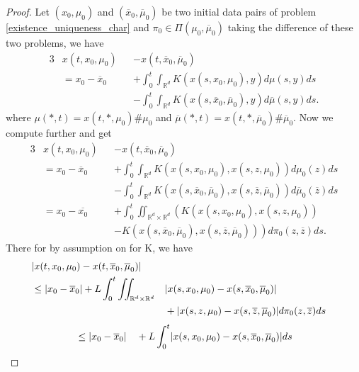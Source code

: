 \begin{proof}
  Let $(x_{0},\mu_0)$  and $(\overline{x}_0,\overline{\mu }_0  )$ be two initial data pairs of problem \autoref{existence_uniqueness_char}
  and $\pi_0 \in  \Pi (\mu_0,\overline{\mu }_0 )$ taking the difference of these two problems, we have 
  \begin{alignat*}{3}
    &x(t,x_{0},\mu_0) &&- x(t,\overline{x}_0,\overline{\mu }_0  ) \\
    &= x_{0}-\overline{x}_0 &&+ \int_0^{t} \int_{\mathbb{R}^{d} }   K(x(s,x_{0},\mu_0),y) d\mu(s,y) ds  \\
    & &&- \int_0^{t} \int_{\mathbb{R}^{d} } K(x(s,\overline{x}_0,\overline{\mu }_0),y) d \overline{\mu }(s,y)ds
  .\end{alignat*}
where $\mu(*,t) = x(t,*,\mu_0) \# \mu_0$ and $\overline{\mu }(*,t) = x(t,*,\overline{\mu }_0 ) \# \overline{\mu }_0$. Now we compute further and get 
\begin{alignat*}{3}
  &x(t,x_{0},\mu_0) &&- x(t,\overline{x}_0,\overline{\mu }_0  )\\
  &= x_{0}-\overline{x}_0 &&+ \int_0^{t} \int_{\mathbb{R}^{d} } K(x(s,x_{0},\mu_0),x(s,z,\mu_0)) d\mu_0(z) ds \\
  & &&- \int_0^{t} \int_{\mathbb{R}^{d} } K(x(s,\overline{x}_0,\overline{\mu }_0  ),x(s,\overline{z},\overline{\mu }_0  )) d \overline{\mu }_0(\overline{z} )  ds\\
  &= x_0 - \overline{x_0}  &&+ \int_0^{t} \iint_{\mathbb{R}^{d} \times  \mathbb{R}^{d}  } \left(K(x(s,x_{0},\mu_0),x(s,z,\mu_0)) \right.\\
  & &&-\left. K(x(s,\overline{x}_0,\overline{\mu }_0  ),x(s,\overline{z},\overline{\mu }_0  ))\right) d\pi_0(z,\overline{z} ) ds
.\end{alignat*}
There for by assumption on  for K, we have 
\begin{alignat*}{3}
  &\lvert x(t,x_{0},\mu_0) - x(t,\overline{x}_0,\overline{\mu }_0  )\rvert  \\
  &\le \lvert x_{0}-\overline{x}_0 \rvert + L \int_0^{t} \iint_{\mathbb{R}^{d} \times  \mathbb{R}^{d}  }&&\lvert x(s,x_{0},\mu_0)- x(s,\overline{x}_0,\overline{\mu }_0  )\rvert  \\
  &  &&+ \lvert x(s,z,\mu_0) - x(s,\overline{z},\overline{\mu }_0  )\rvert  d\pi_0(z,\overline{z} ) ds
\end{alignat*}
\vspace{-\baselineskip}
\begin{alignat*}{3}
  &\le \abs{x_{0}-\overline{x}_0 } &&+ L \int_0^{t} \abs{x(s,x_{0},\mu_0)- x(s,\overline{x}_0,\overline{\mu }_0  )} ds \\

\end{alignat*}
\end{proof}

